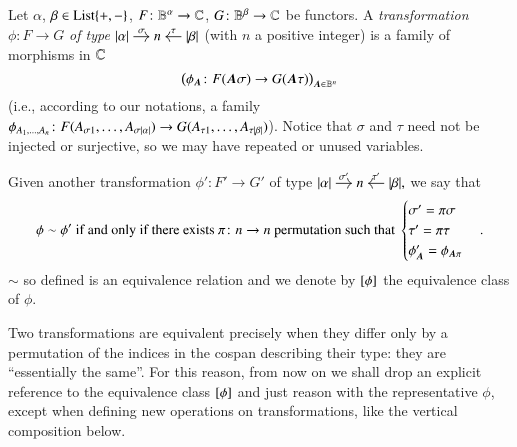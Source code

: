 \begin{definition}\label{def:transformation}
	Let $\alpha$, $\beta \in \mathrm{List}\{+,-\}$, $F \colon \mathbb B^\alpha \to \mathbb C$, $G \colon \mathbb B^\beta \to \mathbb C$ be functors. A \emph{transformation} $\phi \colon F \to G$ \emph{of type} 
	$
	\begin{tikzcd}[cramped,sep=small]
	\length\alpha \ar[r,"\sigma"] & n & \length\beta \ar[l,"\tau"']
	\end{tikzcd}
	$ 
	(with $n$ a positive integer) is a family of morphisms in $\mathbb C$
	\[
	\bigl( \phi_{\bfA} \colon F(\bfA\sigma) \to G(\bfA\tau) \bigr)_{\bfA \in \B^n}
	\]
	(i.e., according to our notations, a family $\phi_{A_1,\dots,A_n} \colon F(A_{\sigma 1}, \dots, A_{\sigma\length\alpha}) \to G(A_{\tau1},\dots,A_{\tau\length\beta})$). Notice that $\sigma$ and $\tau$ need not be injected or surjective, so we may have repeated or unused variables.
	
	Given another transformation $\phi' \colon F' \to G'$ of type
	$
	\begin{tikzcd}[cramped,sep=small]
	\length\alpha \ar[r,"\sigma'"] & n & \length\beta \ar[l,"\tau'"']
	\end{tikzcd},
	$
	we say that
	\[
	\phi \sim {\phi'} \text{ if and only if there exists } \pi \colon n \to n \text{ permutation such that }
	\begin{cases}
	\sigma' = \pi\sigma \\
	\tau' = \pi\tau \\
	\phi'_\bfA = \phi_{\bfA\pi}
	\end{cases}. 
	\]
	$\sim$ so defined is an equivalence relation and we denote by $\class\phi$ the equivalence class of $\phi$. 
\end{definition}

\begin{remark}
	Two transformations are equivalent precisely when they differ only by a permutation of the indices in the cospan describing their type: they are ``essentially the same''. For this reason, from now on we shall drop an explicit reference to the equivalence class $\class\phi$ and just reason with the representative $\phi$, except when defining new operations on transformations, like the vertical composition below.
\end{remark}

